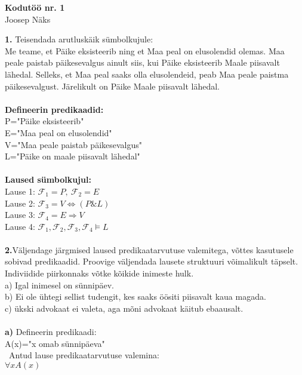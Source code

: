 \documentclass[fullpage]{article}
\begin{document}
\begin{center}
\Large\textbf{Kodut\"o\"o nr. 1}\\
Joosep N\"aks
\end{center}
\textbf{1.} Teisendada arutlusk\"aik s\"umbolkujule:\\
Me teame, et P\"aike eksisteerib ning et Maa peal on elusolendid olemas. Maa peale paistab p\"aikesevalgus ainult siis, kui P\"aike eksisteerib Maale piisavalt l\"ahedal. Selleks, et Maa peal saaks olla elusolendeid, peab Maa peale paistma p\"aikesevalgust. J\"arelikult on P\"aike Maale piisavalt l\"ahedal.\\\\
\textbf{Defineerin predikaadid:}\\
P="P\"aike eksisteerib"\\
E="Maa peal on elusolendid"\\
V="Maa peale paistab p\"aikesevalgus"\\
L="P\"aike on maale piisavalt l\"ahedal"\\\\
\textbf{Laused s\"umbolkujul:}\\
Lause 1: $\mathcal{F}_1 = P,\ \mathcal{F}_2 = E$\\
Lause 2: $\mathcal{F}_3 = V\Leftrightarrow (P\&L)$\\
Lause 3: $\mathcal{F}_4 = E\Rightarrow V$\\
Lause 4: $\mathcal{F}_1,\mathcal{F}_2, \mathcal{F}_3, \mathcal{F}_4 \models L$\\\\
\textbf{2.}V\"aljendage j\"argmised laused predikaatarvutuse valemitega, v\~ottes kasutusele sobivad predikaadid. Proovige v\"aljendada lausete struktuuri v\~oimalikult t\"apselt. Indiviidide piirkonnaks v\~otke k\~oikide inimeste hulk.\\
\null\quad a) Igal inimesel on s\"unnip\"aev.\\
\null\quad b) Ei ole \"uhtegi sellist tudengit, kes saaks \"o\"ositi piisavalt kaua magada.\\
\null\quad c) \"ukski advokaat ei valeta, aga m\~oni advokaat k\"aitub ebaausalt.\\\\
\textbf{a)} Defineerin predikaadi:\\
\null\quad\quad A(x)="x omab s\"unnip\"aeva"\\
\null\quad\ Antud lause predikaatarvutuse valemina:\\
\null\quad\quad $\forall xA(x)$\\
\end{document}
